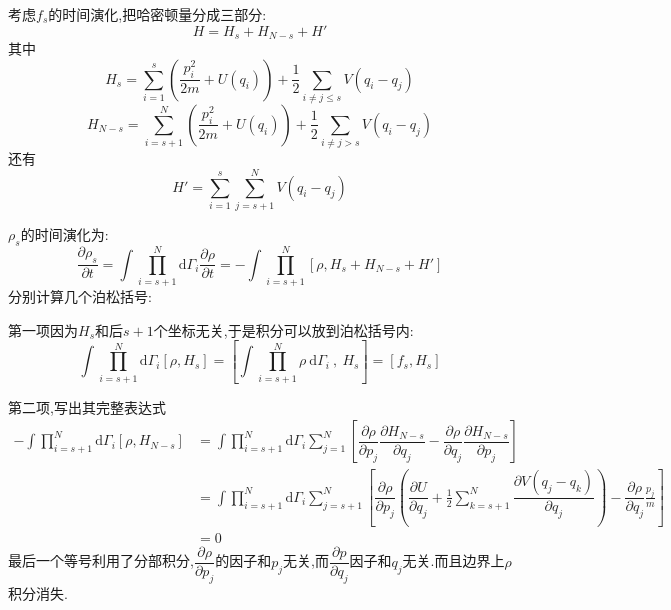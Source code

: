     考虑$f_{s}$的时间演化,把哈密顿量分成三部分:
    \[H=H_{s}+H_{N-s}+H'\]
    其中
    \[H_{s}=\sum_{i=1}^{s}\left( \frac{p_{i}^{2}}{2m}+U(q_{i}) \right) +\frac{1}{2}\sum_{i\neq j\le s}V(q_{i}-q_{j})\]
    \[H_{N-s}=\sum_{i=s+1}^{N}\left( \frac{p_{i}^{2}}{2m}+U(q_{i}) \right) +\frac{1}{2}\sum_{i\neq j> s}V(q_{i}-q_{j})\]
    还有
    \[H'=\sum_{i=1}^{s}\sum_{j=s+1}^{N}V(q_{i}-q_{j})\]

    $\rho_{s}$的时间演化为:
    \begin{equation}
      \dfrac{\partial \rho_{s}}{\partial t}=\int \prod_{i=s+1}^{N} \mathrm{d} \Gamma_{i} \dfrac{\partial \rho}{\partial t}=-\int \prod_{i=s+1}^{N} [\rho,H_{s}+H_{N-s}+H']
    \end{equation}
    分别计算几个泊松括号:
    
    第一项因为$H_{s}$和后$s+1$个坐标无关,于是积分可以放到泊松括号内:
    \[\int \prod_{i=s+1}^{N} \mathrm{d}\Gamma_{i}[\rho,H_{s}]=\left[ \int \prod_{i=s+1}^{N} \rho~\mathrm{d}\Gamma_{i}  ~,~ H_{s} \right]=[f_{s},H_{s}] \]
    
    第二项,写出其完整表达式
    \begin{align*}
      -\int \prod_{i=s+1}^{N} \mathrm{d} \Gamma_{i} [\rho,H_{N-s}]&=\int \prod_{i=s+1}^{N} \mathrm{d} \Gamma_{i} \sum_{j=1}^{N}\left[ \dfrac{\partial \rho}{\partial p_{j}}\dfrac{\partial H_{N-s}}{\partial q_{j}}-\dfrac{\partial \rho}{\partial q_{j}}\dfrac{\partial H_{N-s}}{\partial p_{j}} \right] 
      \\ 
      &=\int \prod_{i=s+1}^{N} \mathrm{d} \Gamma_{i} \sum_{j=s+1}^{N} \left[ \dfrac{\partial \rho}{\partial p_{j}}\left( \dfrac{\partial U}{\partial q_{j}}+\frac{1}{2}\sum_{k=s+1}^{N} \dfrac{\partial V(q_{j}-q_{k})}{\partial q_{j}} \right) -\dfrac{\partial \rho}{\partial q_{j}}\frac{p_{j}}{m}
      \right]
      \\
      &=0 
    \end{align*}
    最后一个等号利用了分部积分,$\dfrac{\partial \rho}{\partial p_{j}}$的因子和$p_{j}$无关,而$\dfrac{\partial p}{\partial q_{j}}$因子和$q_{j}$无关.而且边界上$\rho$积分消失.

